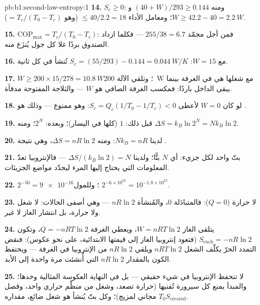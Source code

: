 \begin{solution}{pb:b1:second-law-entropy:1}
\textbf{14.} $S_c \geq 0$: ومنه $(40 + W)/293 \geq 0.144$ و $W \geq 42.2 - 40 =
\qty{2.2}{W}$؛ ومعامل الأداء $\leq 40/2.2 = 18$ (وهو $= T_c/(T_0 - T_c)$).

\textbf{15.} $\mathrm{COP}_{\max} = T_c/(T_0 - T_c)$: فمن أجل مجمّد $255/38 = 6.7$
--- فكلما ازداد الصندوق بردًا غلا كل جول يُنزَع منه.

\textbf{16.} مع $W = 15$: $S_c = (55/293) - 0.144 = \qty{0.044}{W/K}$ تُنشأ
في كل ثانية.

\textbf{17.} $W \geq 200 \times 15/278 = \qty{10.8}{W}$؛ وتلقي الآلة
\qty{200}{W} مع شغلها هي في الغرفة بينما يبقى الداخل
باردًا: فمكسب الغرفة الصافي هو $W$ --- والثلاجة المفتوحة مدفأة.

\textbf{18.} لو كان $W = 0$ لأعطى $S_c = Q_c(1/T_0 - 1/T_c) < 0$: وهو ممنوع ---
وذلك هو .

\textbf{19.} قبل ذلك: $1$ (كلها في اليسار)؛ وبعده: $2^N$؛ ومنه $\Delta S = k_B\ln2^N =
Nk_B\ln2$.

\textbf{20.} لدينا $Nk_B = nR$: ومنه $\Delta S = nR\ln2$، وهي نتيجة .

\textbf{21.} بتّ واحد لكل جزيء: أي $N$ بتًّا؛ ولدينا $\Delta S/(k_B\ln2) = N$ ---
فالإنتروبيا تعدّ المعلومات التي يحتاج إليها المرء ليحدّد مواضع
الجزيئات.

\textbf{22.} $2^{-50} = \num{9e-16}$؛ وللمول $2^{-6\times10^{23}} =
10^{-1.8\times10^{23}}$.

\textbf{23.} لا حرارة ($Q = 0$): فالمتبادَلة $0$، والمُنشأة $nR\ln2$ --- وهي
أصفى الحالات: لا شغل ولا حرارة، بل انتشار الغاز لا غير.

\textbf{24.} يتلقى الغاز $W = nRT\ln2$، ويعطي الغرفة $Q = -nRT\ln2$،
وتكون $S_{\mathrm{exch}} = -nR\ln2$ (فتعود إنتروبيا الغاز إلى قيمتها
الابتدائية، على نحو عكوس): فنقض التمدد الحرّ يكلّف الشغل $nRT\ln2$
ويلقي $nR\ln2$ من الإنتروبيا في الغرفة --- ويحتفظ الكون بالمقدار $nR\ln2$
التي أُنشئت مرة واحدة إلى الأبد.

\textbf{25.} لا تنحفظ الإنتروبيا في شيء حقيقي --- بل في النهاية
العكوسة المثالية وحدها؛ والمبدأ يمنع كل سيرورة تُفنيها (حرارة
تصعد، وشغل من منظِّم حراري واحد، وفصل مجاني لمزيج)؛
وكل بتّ يُنشأ هو شغل ضائع، مقداره $T_0S_{\mathrm{created}}$.
\end{solution}
